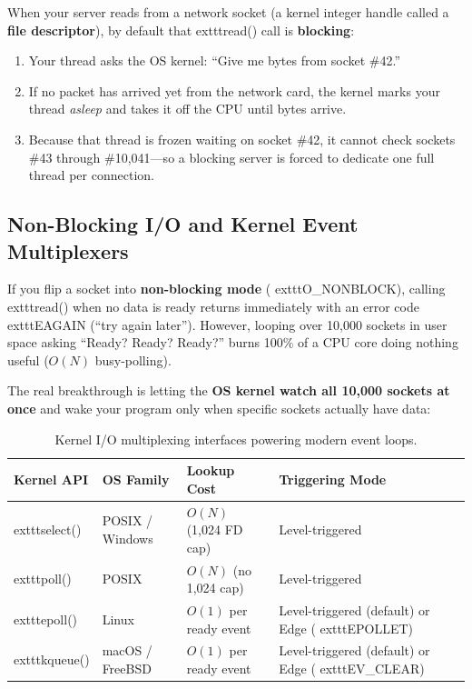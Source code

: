 When your server reads from a network socket (a kernel integer handle called a \textbf{file descriptor}), by default that 	exttt{read()} call is \textbf{blocking}:
\begin{enumerate}[leftmargin=15pt]
  \item Your thread asks the OS kernel: ``Give me bytes from socket \#42.''
  \item If no packet has arrived yet from the network card, the kernel marks your thread \emph{asleep} and takes it off the CPU until bytes arrive.
  \item Because that thread is frozen waiting on socket \#42, it cannot check sockets \#43 through \#10,041---so a blocking server is forced to dedicate one full thread per connection.
\end{enumerate}

\subsection{Non-Blocking I/O and Kernel Event Multiplexers}

If you flip a socket into \textbf{non-blocking mode} (	exttt{O\_NONBLOCK}), calling 	exttt{read()} when no data is ready returns immediately with an error code 	exttt{EAGAIN} (``try again later''). However, looping over 10,000 sockets in user space asking ``Ready? Ready? Ready?'' burns 100\% of a CPU core doing nothing useful ($O(N)$ busy-polling).

The real breakthrough is letting the \textbf{OS kernel watch all 10,000 sockets at once} and wake your program only when specific sockets actually have data:

\begin{table}[htbp]
\centering
\small\sffamily
\begin{tabular}{@{}llll@{}}
\toprule
\textbf{Kernel API} & \textbf{OS Family} & \textbf{Lookup Cost} & \textbf{Triggering Mode} \\ \midrule
	exttt{select()} & POSIX / Windows & $O(N)$ (1,024 FD cap) & Level-triggered \\
	exttt{poll()} & POSIX & $O(N)$ (no 1,024 cap) & Level-triggered \\
	exttt{epoll()} & Linux & $O(1)$ per ready event & Level-triggered (default) or Edge (	exttt{EPOLLET}) \\
	exttt{kqueue()} & macOS / FreeBSD & $O(1)$ per ready event & Level-triggered (default) or Edge (	exttt{EV\_CLEAR}) \\ \bottomrule
\end{tabular}
\caption{Kernel I/O multiplexing interfaces powering modern event loops.}
\label{tab:v1-ch02-multiplexing}
\end{table}

